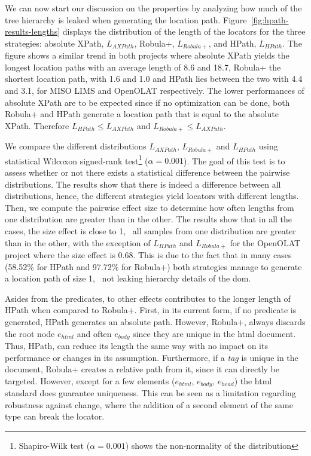 We can now start our discussion on the properties by analyzing how much of the tree hierarchy is leaked when generating the location path. Figure~\ref{fig:hpath-results-lengths} displays the distribution of the length of the locators for the three strategies: absolute XPath, $L_{AXPath}$, Robula+, $L_{Robula+}$, and HPath, $L_{HPath}$. The figure shows a similar trend in both projects where absolute XPath yields the longest location paths with an average length of 8.6 and 18.7, Robula+ the shortest location path, with 1.6 and 1.0 and HPath lies between the two with 4.4 and 3.1, for MISO LIMS and OpenOLAT respectively. The lower performances of absolute XPath are to be expected since if no optimization can be done, both Robula+ and HPath generate a location path that is equal to the absolute XPath. Therefore $L_{HPath} \leq L_{AXPath}$ and $L_{Robula+} \leq L_{AXPath}$.

We compare the different distributions $L_{AXPath}$, $L_{Robula+}$ and $L_{HPath}$ using statistical Wilcoxon signed-rank test\footnote{Shapiro-Wilk test ($\alpha=0.001$) shows the non-normality of the distribution} ($\alpha=0.001$). The goal of this test is to assess whether or not there exists a statistical difference between the pairwise distributions. The results show that there is indeed a difference between all distributions, hence, the different strategies yield locators with different lengths. Then, we compute the pairwise effect size to determine how often lengths from one distribution are greater than in the other. The results show that in all the cases, the size effect is close to 1, \ie\ all samples from one distribution are greater than in the other, with the exception of $L_{HPath}$ and $L_{Robula+}$ for the OpenOLAT project where the size effect is 0.68. This is due to the fact that in many cases (58.52\% for HPath and 97.72\% for Robula+) both strategies manage to generate a location path of size 1, \ie\ not leaking hierarchy details of the \gls{dom}.

Asides from the predicates, to other effects contributes to the longer length of HPath when compared to Robula+. First, in its current form, if no predicate is generated, HPath generates an absolute path. However, Robula+, always discards the root node $e_{html}$ and often $e_{body}$ since they are unique in the \gls{html} document. Thus, HPath, can reduce its length the same way with no impact on its performance or changes in its assumption. Furthermore, if a \emph{tag} is unique in the document, Robula+ creates a relative path from it, since it can directly be targeted. However, except for a few elements ($e_{html}$, $e_{body}$, $e_{head}$) the \gls{html} standard does guarantee uniqueness. This can be seen as a limitation regarding robustness against change, where the addition of a second element of the same type can break the locator.

